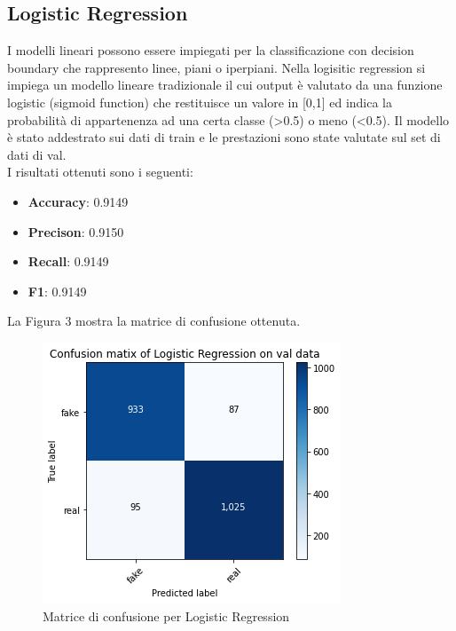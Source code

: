 \documentclass{article}
\begin{document}
\subsection{Logistic Regression}
I modelli lineari possono essere impiegati per la classificazione con decision boundary che rappresento linee, piani o iperpiani. Nella logisitic regression si impiega un modello lineare tradizionale il cui output è valutato da una funzione logistic (sigmoid function) che restituisce un valore in [0,1] ed indica la probabilità di appartenenza ad una certa classe (\textgreater 0.5) o meno (\textless 0.5). Il modello è stato addestrato sui dati di train e le prestazioni sono state valutate sul set di dati di val. \\
I risultati ottenuti sono i seguenti:
\begin{itemize}[noitemsep]
  \item \textbf{Accuracy}: 0.9149
  \item \textbf{Precison}: 0.9150
  \item \textbf{Recall}: 0.9149
  \item \textbf{F1}: 0.9149
 \end{itemize}


\noindent
La Figura 3 mostra la matrice di confusione ottenuta.
\begin{figure}[H]
\includegraphics[width=0.4\linewidth]{logistic_regression.png}
\centering
\caption{Matrice di confusione per Logistic Regression}
\label{fig:bytepost}
\end{figure}
\end{document}
